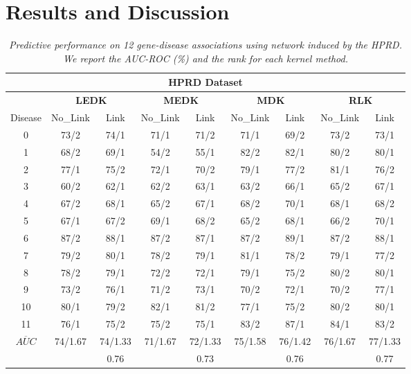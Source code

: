 \documentclass[runningheads,a4paper]{llncs}
\begin{document}
\section{Results and Discussion}
\label{results-discussion}
\begin{table*}[!htb]
\centering
\begin{tabular}{|c|c|c|c|c|c|c|c|c|}
\hline
         \multicolumn{9}{|c|}{\textbf{HPRD Dataset}}\\
 \hline
 & \multicolumn{2}{c|}{\textbf{LEDK}} & \multicolumn{2}{c|}{\textbf{MEDK}} & \multicolumn{2}{c|}{\textbf{MDK}} & \multicolumn{2}{c|}{\textbf{RLK}} \\
 \hline
  Disease & No\_Link & Link & No\_Link & Link & No\_Link & Link & No\_Link & Link \\
 \hline
  0 & 73/2 & 74/1 & 71/1 & 71/2 & 71/1 & 69/2 & 73/2 & 73/1 \\

  1 & 68/2 & 69/1 & 54/2 & 55/1 & 82/2 & 82/1 & 80/2 & 80/1 \\

  2 & 77/1 & 75/2 & 72/1 & 70/2 & 79/1 & 77/2 & 81/1 & 76/2 \\

  3 & 60/2 & 62/1 & 62/2 & 63/1 & 63/2 & 66/1 & 65/2 & 67/1 \\

  4 & 67/2 & 68/1 & 65/2 & 67/1 & 68/2 & 70/1 & 68/1 & 68/2 \\

  5 & 67/1 & 67/2 & 69/1 & 68/2 & 65/2 & 68/1 & 66/2 & 70/1 \\

  6 & 87/2 & 88/1 & 87/2 & 87/1 & 87/2 & 89/1 & 87/2 & 88/1 \\

  7 & 79/2 & 80/1 & 78/2 & 79/1 & 81/1 & 78/2 & 79/1 & 77/2 \\

  8 & 78/2 & 79/1 & 72/2 & 72/1 & 79/1 & 75/2 & 80/2 & 80/1 \\

  9 & 73/2 & 76/1 & 71/2 & 73/1 & 70/2 & 72/1 & 70/2 & 77/1 \\

  10 & 80/1 & 79/2 & 82/1 & 81/2 & 77/1 & 75/2 & 80/2 & 80/1 \\

  11 & 76/1 & 75/2 & 75/2 & 75/1 & 83/2 & 87/1 & 84/1 & 83/2 \\

 \hline
  $\overline{AUC}$ & 74/1.67 & 74/1.33 & 71/1.67 & 72/1.33 & 75/1.58 & 76/1.42 & 76/1.67 & 77/1.33 \\
\hline
    & & 0.76 & & 0.73 & & 0.76 & & 0.77 \\
\hline
\end{tabular}
\caption{\textit {Predictive performance on 12 gene-disease associations using network induced by the HPRD. We report the AUC-ROC (\%) and the rank for each kernel method.}}
\label{table:results}
\end{table*}
\end{document}
